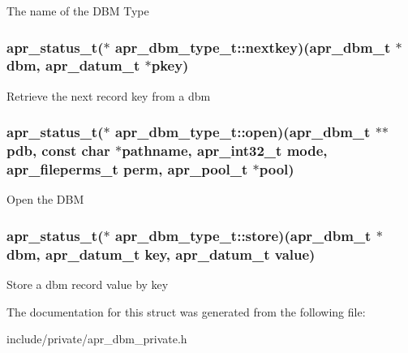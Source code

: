The name of the D\-B\-M Type \hypertarget{structapr__dbm__type__t_ace0c5f3bc24df10170b4031b48fd9af0}{
\subsubsection[{nextkey}]{\setlength{\rightskip}{0pt plus 5cm}apr\-\_\-status\-\_\-t($\ast$ apr\-\_\-dbm\-\_\-type\-\_\-t\-::nextkey)({\bf apr\-\_\-dbm\-\_\-t} $\ast$dbm, {\bf apr\-\_\-datum\-\_\-t} $\ast$pkey)}}\label{structapr__dbm__type__t_ace0c5f3bc24df10170b4031b48fd9af0}
Retrieve the next record key from a dbm \hypertarget{structapr__dbm__type__t_a4695443269822d7ca9208bd6579d3635}{
\subsubsection[{open}]{\setlength{\rightskip}{0pt plus 5cm}apr\-\_\-status\-\_\-t($\ast$ apr\-\_\-dbm\-\_\-type\-\_\-t\-::open)({\bf apr\-\_\-dbm\-\_\-t} $\ast$$\ast$pdb, const char $\ast$pathname, apr\-\_\-int32\-\_\-t mode, apr\-\_\-fileperms\-\_\-t perm, apr\-\_\-pool\-\_\-t $\ast$pool)}}\label{structapr__dbm__type__t_a4695443269822d7ca9208bd6579d3635}
Open the D\-B\-M \hypertarget{structapr__dbm__type__t_ae156d00ff445fbe6472565165f7e746c}{
\subsubsection[{store}]{\setlength{\rightskip}{0pt plus 5cm}apr\-\_\-status\-\_\-t($\ast$ apr\-\_\-dbm\-\_\-type\-\_\-t\-::store)({\bf apr\-\_\-dbm\-\_\-t} $\ast$dbm, {\bf apr\-\_\-datum\-\_\-t} key, {\bf apr\-\_\-datum\-\_\-t} value)}}\label{structapr__dbm__type__t_ae156d00ff445fbe6472565165f7e746c}
Store a dbm record value by key 

The documentation for this struct was generated from the following file\-:\begin{DoxyCompactItemize}
\item 
include/private/apr\-\_\-dbm\-\_\-private.\-h\end{DoxyCompactItemize}
